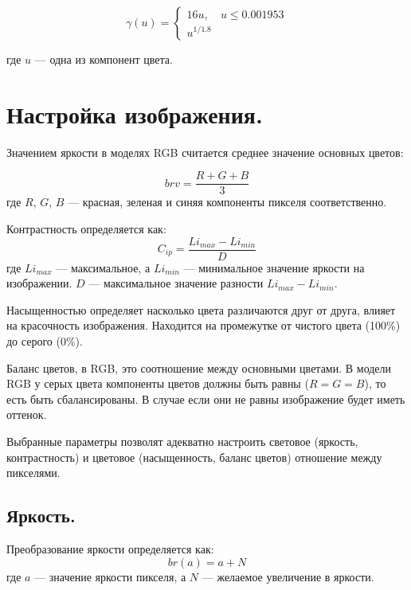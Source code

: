 \begin{equation}
	\label{gamma}
	\gamma(u) = 
	\begin{cases}
		16u, & u \le 0.001953 \\
		u^{1/1.8}
	\end{cases}
\end{equation}

где $u$ --- одна из компонент цвета. \cite{ppspec}

\section{Настройка изображения.}

Значением яркости в моделях RGB считается среднее значение основных цветов:

\begin{equation}
	\label{br}
	brv = \frac{R + G + B}{3}
\end{equation}
где $R$, $G$, $B$ --- красная, зеленая и синяя компоненты пикселя соответственно. \cite{colorfaq}

Контрастность определяется как:
\begin{equation}
	\label{condef}
	C_{ip} = \frac{Li_{max} - Li_{min}}{D}
\end{equation}
где $Li_{max}$ --- максимальное, а $Li_{min}$ --- минимальное значение яркости на изображении. $D$ --- максимальное значение разности $Li_{max} - Li_{min}$. \cite{contrastdef}

Насыщенностью определяет насколько цвета различаются друг от друга, влияет на красочность изображения. Находится на промежутке от чистого цвета (100\%) до серого (0\%). \cite{satdef}

Баланс цветов, в RGB, это соотношение между основными цветами. В модели RGB у серых цвета компоненты цветов должны быть равны ($R = G = B$), то есть быть сбалансированы. В случае если они не равны изображение будет иметь оттенок.\cite{colorb}

Выбранные параметры позволят адекватно настроить световое (яркость, контрастность) и цветовое (насыщенность, баланс цветов) отношение между пикселями. 

\subsection{Яркость.}

Преобразование яркости определяется как:
\begin{equation}
	\label{brightness}
	br(a) = a + N
\end{equation}
где $a$ --- значение яркости пикселя, а $N$ --- желаемое увеличение в яркости. \cite{brk}

